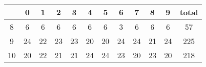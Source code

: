 
\begin{tabular}{| c |  c  c  c  c  c  c  c  c  c  c  || c |}
\hline 
 & 0 &	 1	 &	 2	 &	 3	 &	 4	 &	 5	 &	 6	 &	 7	 &	 8	 &	 9	 &	 total 	\\
\hline 
8	 &	 6	 &	 6	 &	 6	 &	 6	 &	 6	 &	 6	 &	 3	 &	 6	 &	 6	 &	 6	 &	 57	\\
9	 &	 24	 &	 22	 &	 23	 &	 23	 &	 20	 &	 20	 &	 24	 &	 24	 &	 21	 &	 24	 &	 225	\\
10	 &	 20	 &	 22	 &	 21	 &	 21	 &	 24	 &	 24	 &	 23	 &	 20	 &	 23	 &	 20	 &	 218	\\
\hline\end{tabular}

